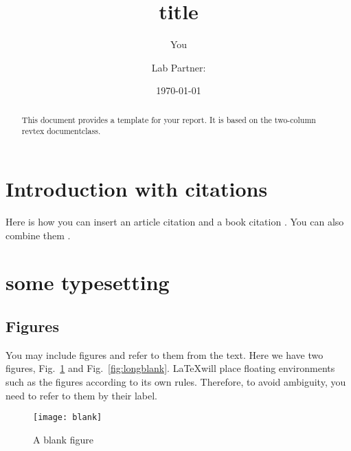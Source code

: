 \documentclass[aps,pre,twocolumn,nofootinbib]{revtex4}
\begin{document}
\title{title}



\author{You}
\author{Lab Partner: }

\date{\today}

\begin{abstract}  
This document provides a template for your report. It is  based on the two-column revtex documentclass.
\end{abstract}


\maketitle



\section{Introduction with citations}

Here is how you can insert an article citation \cite{Einstein1905} and a book citation \cite{Arfken2001}. You can also combine them \cite{Einstein1905,Arfken2001}.

\section{some typesetting}

\subsection{Figures}

You may include figures and refer to them from the text. Here we have  two figures, Fig.~\ref{fig:blank} and Fig.~\ref{fig:longblank}. \LaTeX will place floating environments such as the figures according to its own rules. Therefore, to avoid ambiguity, you need to refer to them by their label.
%
\begin{figure}[h]
\centering
\texttt{[image: blank]} 
\caption{A blank figure }
\label{fig:blank}
\end{figure}
\end{document}
